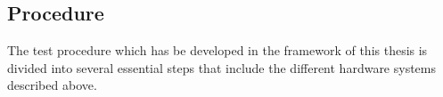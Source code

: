 \subsection{Procedure}
\label{sec:proc}
The test procedure which has be developed in the framework of this thesis is divided into several essential steps that include the different hardware systems described above.
